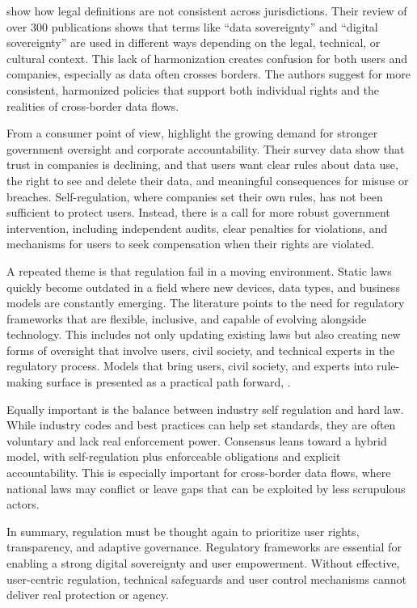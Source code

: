 	\cite{Hummel2021} show how legal definitions are not consistent across jurisdictions. Their review of over 300 publications shows that terms like “data sovereignty” and “digital sovereignty” are used in different ways depending on the legal, technical, or cultural context. This lack of harmonization creates confusion for both users and companies, especially as data often crosses borders. The authors suggest for more consistent, harmonized policies that support both individual rights and the realities of cross-border data flows.

	From a consumer point of view, \cite{Arbanas2023} highlight the growing demand for stronger government oversight and corporate accountability. Their survey data show that trust in companies is declining, and that users want clear rules about data use, the right to see and delete their data, and meaningful consequences for misuse or breaches. 
	Self-regulation, where companies set their own rules, has not been sufficient to protect users. Instead, there is a call for more robust government intervention, including independent audits, clear penalties for violations, and mechanisms for users to seek compensation when their rights are violated.

	A repeated theme is that regulation fail in a moving environment. Static laws quickly become outdated in a field where new devices, data types, and business models are constantly emerging. The literature points to the need for regulatory frameworks that are flexible, inclusive, and capable of evolving alongside technology. This includes not only updating existing laws but also creating new forms of oversight that involve users, civil society, and technical experts in the regulatory process. Models that bring users, civil society, and experts into rule-making surface is presented as a practical path forward, \cite{Sui2023}.

	Equally important is the balance between industry self regulation and hard law. While industry codes and best practices can help set standards, they are often voluntary and lack real enforcement power. Consensus leans toward a hybrid model, with self-regulation plus enforceable obligations and explicit accountability. This is especially important for cross-border data flows, where national laws may conflict or leave gaps that can be exploited by less scrupulous actors.

	In summary, regulation must be thought again to prioritize user rights, transparency, and adaptive governance. Regulatory frameworks are essential for enabling a strong digital sovereignty and user empowerment. Without effective, user-centric regulation, technical safeguards and user control mechanisms cannot deliver real protection or agency. 
